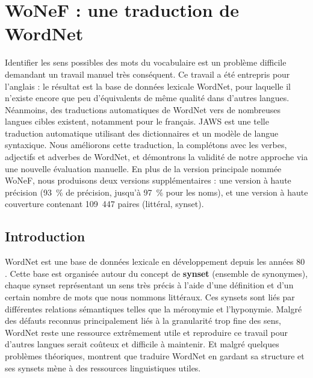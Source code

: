 \chapter{WoNeF : une traduction de WordNet}
\label{ch:wonef} 

Identifier les sens possibles des mots du vocabulaire est un problème difficile
demandant un travail manuel très conséquent. Ce travail a été entrepris pour
l'anglais : le résultat est la base de données lexicale WordNet, pour laquelle
il n'existe encore que peu d'équivalents de même qualité dans d'autres langues.
Néanmoins, des traductions automatiques de WordNet vers de nombreuses langues
cibles existent, notamment pour le français. JAWS est une telle traduction
automatique utilisant des dictionnaires et un modèle de langue syntaxique. Nous
améliorons cette traduction, la complétons avec les verbes, adjectifs et
adverbes de WordNet, et démontrons la validité de notre approche via une
nouvelle évaluation manuelle. En plus de la version principale nommée WoNeF,
nous produisons deux versions supplémentaires : une version à haute précision
(93~\% de précision, jusqu'à 97~\% pour les noms), et une version à haute
couverture contenant 109~447 paires (littéral, synset).


\section{Introduction}
\label{sec:intro}

WordNet est une base de données lexicale en développement depuis les années 80 \citep{fellbaum1998wordnet}. Cette base est organisée autour du concept de \textbf{synset} (ensemble de synonymes), chaque synset représentant un sens très précis à l'aide d'une définition et d'un certain nombre de mots que nous nommons littéraux. Ces synsets sont liés par différentes relations sémantiques telles que la méronymie et l'hyponymie. Malgré des défauts reconnus \citep{boyd2006adding} principalement liés à la granularité trop fine des sens, WordNet reste une ressource extrêmement utile et reproduire ce travail pour d'autres langues serait coûteux et difficile à maintenir. Et malgré quelques problèmes théoriques, \cite{fellbaum2007connecting,demelo2008utility} montrent que traduire WordNet en gardant sa structure et ses synsets mène à des ressources linguistiques utiles.

